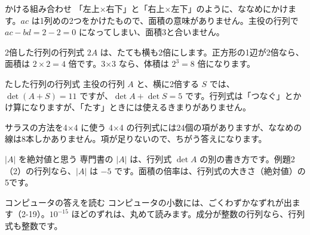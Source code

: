 
\begin{tsumazuki}{かける組み合わせ}
「左上×右下」と「右上×左下」のように、ななめにかけます。$ac$ は1列めの2つをかけたもので、面積の意味がありません。主役の行列で $ac-bd=2-2=0$ になってしまい、面積3と合いません。
\end{tsumazuki}

\begin{tsumazuki}{2倍した行列の行列式}
$2A$ は、たても横も2倍にします。正方形の1辺が2倍なら、面積は $2\times2=4$ 倍です。3×3 なら、体積は $2^3=8$ 倍になります。
\end{tsumazuki}

\begin{tsumazuki}{たした行列の行列式}
主役の行列 $A$ と、横に2倍する $S$ では、$\det(A+S)=11$ ですが、$\det A+\det S=5$ です。行列式は「つなぐ」とかけ算になりますが、「たす」ときには使えるきまりがありません。
\end{tsumazuki}

\begin{tsumazuki}{サラスの方法を4×4 に使う}
4×4 の行列式には24個の項がありますが、ななめの線は8本しかありません。項が足りないので、ちがう答えになります。
\end{tsumazuki}

\begin{tsumazuki}{$|A|$ を絶対値と思う}
専門書の $|A|$ は、行列式 $\det A$ の別の書き方です。例題2（2）の行列なら、$|A|$ は $-5$ です。面積の倍率は、行列式の大きさ（絶対値）の5です。
\end{tsumazuki}

\begin{tsumazuki}{コンピュータの答えを読む}
コンピュータの小数には、ごくわずかなずれが出ます（2-19）。$10^{-15}$ ほどのずれは、丸めて読みます。成分が整数の行列なら、行列式も整数です。
\end{tsumazuki}

